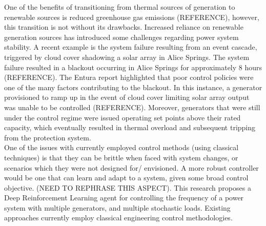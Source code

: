 \documentclass[12pt, a4paper]{article}
\begin{document}
One of the benefits of transitioning from thermal sources of generation to renewable sources is reduced greenhouse gas emissions (REFERENCE), however, this transition is not without its drawbacks. Increased reliance on renewable generation sources has introduced some challenges regarding power system stability. A recent example is the system failure resulting from an event cascade, triggered by cloud cover shadowing a solar array in Alice Springs. The system failure resulted in a blackout occurring in Alice Springs for approximately 8 hours (REFERENCE). The Entura report highlighted that poor control policies were one of the many factors contributing to the blackout. In this instance, a generator provisioned to ramp up in the event of cloud cover limiting solar array output was unable to be controlled (REFERENCE). Moreover, generators that were still under the control regime were issued operating set points above their rated capacity, which eventually resulted in thermal overload and subsequent tripping from the protection system.\\

One of the issues with currently employed control methods (using classical techniques) is that they can be brittle when faced with system changes, or scenarios which they were not designed for/ envisioned. A more robust controller would be one that can learn and adapt to a system, given some broad control objective. (NEED TO REPHRASE THIS ASPECT). This research proposes a Deep Reinforcement Learning agent for controlling the frequency of a power system with multiple generators, and multiple stochastic loads. Existing approaches currently employ classical engineering control methodologies.

\clearpage
\end{document}
